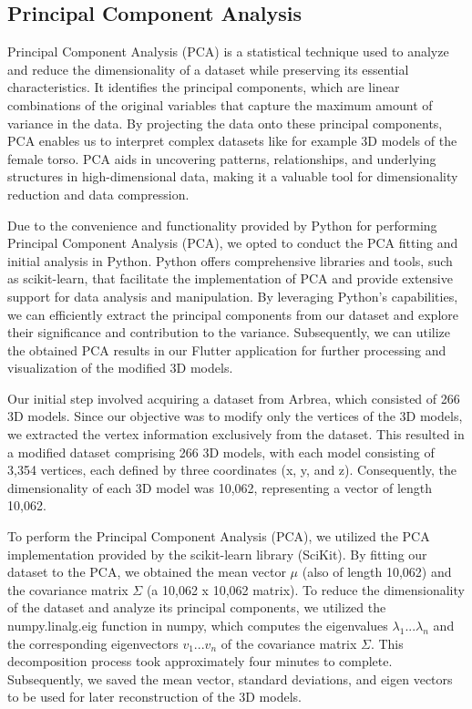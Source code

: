 \subsection{Principal Component Analysis}

Principal Component Analysis (PCA) is a statistical technique used to analyze and reduce the dimensionality of a dataset while preserving its essential characteristics. 
It identifies the principal components, which are linear combinations of the original variables that capture the maximum amount of variance in the data. 
By projecting the data onto these principal components, PCA enables us to interpret complex datasets like for example 3D models of the female torso. PCA aids in uncovering patterns, 
relationships, and underlying structures in high-dimensional data, making it a valuable tool for dimensionality reduction and data compression.

Due to the convenience and functionality provided by Python for performing Principal Component Analysis (PCA), we opted to conduct the PCA fitting and initial analysis in Python. 
Python offers comprehensive libraries and tools, such as scikit-learn, that facilitate the implementation of PCA and provide extensive support for data analysis and manipulation. 
By leveraging Python's capabilities, we can efficiently extract the principal components from our dataset and explore their significance and contribution to the variance. 
Subsequently, we can utilize the obtained PCA results in our Flutter application for further processing and visualization of the modified 3D models.

Our initial step involved acquiring a dataset from Arbrea, which consisted of 266 3D models. Since our objective was to modify only the vertices of the 3D models, we extracted the 
vertex information exclusively from the dataset. This resulted in a modified dataset comprising 266 3D models, with each model consisting of 3,354 vertices, each defined by three coordinates (x, y, and z). 
Consequently, the dimensionality of each 3D model was 10,062, representing a vector of length 10,062.

To perform the Principal Component Analysis (PCA), we utilized the PCA implementation provided by the scikit-learn library (SciKit). By fitting our dataset to the PCA, 
we obtained the mean vector $\mu$ (also of length 10,062) and the covariance matrix $\Sigma$ (a 10,062 x 10,062 matrix). To reduce the dimensionality of the dataset and analyze its principal components, 
we utilized the numpy.linalg.eig function in numpy, which computes the eigenvalues $\lambda_1...\lambda_n$ and the corresponding eigenvectors $v_1...v_n$ of the covariance matrix $\Sigma$. This decomposition process took approximately four minutes to complete. 
Subsequently, we saved the mean vector, standard deviations, and eigen vectors to be used for later reconstruction of the 3D models.

